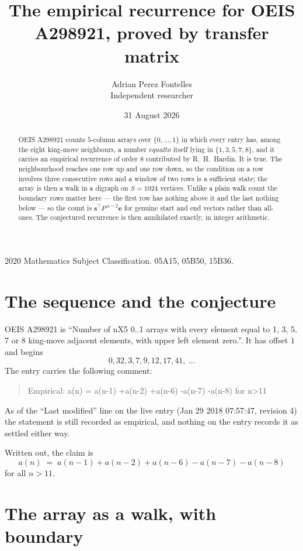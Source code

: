 \documentclass[11pt,a4paper]{article}
\title{The empirical recurrence for OEIS A298921, proved by transfer matrix}
\author{Adrian Perez Fontelles\\ \small Independent researcher}
\date{31 August 2026}
\theoremstyle{plain}
\theoremstyle{definition}
\begin{document}
\maketitle

\begin{abstract}
OEIS A298921 counts $5$-column arrays over $\{0,\dots,1\}$ in which every entry has,
among the eight king-move neighbours, a number $equal to$ itself lying in $\{1,3,5,7,8\}$, and it carries an empirical
recurrence of order $8$ contributed by R.~H.~Hardin. It is true. The neighbourhood
reaches one row up and one row down, so the condition on a row involves three consecutive
rows and a window of two rows is a sufficient state; the array is then a walk in a digraph
on $S=1024$ vertices. Unlike a plain walk count the boundary rows matter here --- the first
row has nothing above it and the last nothing below --- so the count is
$\mathbf{s}^{\!\top}P^{\,n-2}\mathbf{e}$ for genuine start and end vectors rather than
all-ones. The conjectured recurrence is then annihilated exactly, in integer arithmetic.
\end{abstract}

\noindent\small 2020 Mathematics Subject Classification. 05A15, 05B50, 15B36.\normalsize

\section{The sequence and the conjecture}

OEIS A298921 is ``Number of nX5 0..1 arrays with every element equal to 1, 3, 5, 7 or 8 king-move adjacent elements, with upper left element zero.''. It has offset
$1$ and begins
\[
0, 32, 3, 7, 9, 12, 17, 41,\ \dots
\]
The entry carries the following comment:
\begin{quote}\small
Empirical: a(n) = a(n-1) +a(n-2) +a(n-6) -a(n-7) -a(n-8) for n>11
\end{quote}
As of the ``Last modified'' line on the live entry (Jan 29 2018 07:57:47, revision
4) the statement is still recorded as empirical, and nothing on the entry
records it as settled either way.

Written out, the claim is
\begin{equation}\label{eq:conj}
a(n)\;=\;a(n-1) + a(n-2) + a(n-6) - a(n-7) - a(n-8)
\end{equation}
for all $n>11$.

\section{The array as a walk, with boundary}
\end{document}

